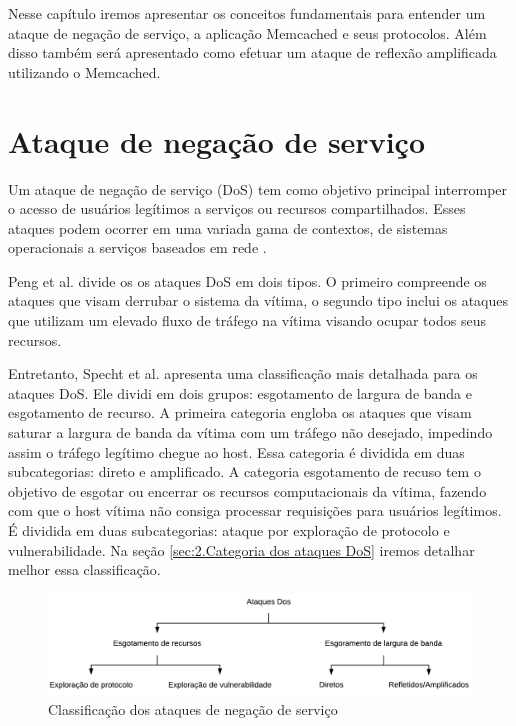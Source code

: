 
Nesse capítulo iremos apresentar os conceitos fundamentais para entender um ataque de negação de serviço, a aplicação Memcached e seus protocolos. Além disso também será apresentado como efetuar um ataque de reflexão amplificada utilizando o Memcached.

\section{Ataque de negação de serviço}

Um ataque de negação de serviço (\acrfull{DoS}) tem como objetivo principal interromper o acesso de usuários legítimos a serviços ou recursos compartilhados. Esses ataques podem ocorrer em uma variada gama de contextos, de sistemas operacionais a serviços baseados em rede \cite{Peng2007}.

Peng et al.\cite{Peng2007} divide os os ataques DoS em dois tipos. O primeiro compreende os ataques que visam derrubar o sistema da vítima, o segundo tipo inclui os ataques que utilizam um elevado fluxo de tráfego na vítima visando ocupar todos seus recursos. 

Entretanto, Specht et al.\cite{Specht2004} apresenta uma classificação mais detalhada para os ataques DoS. Ele dividi em dois grupos: esgotamento de largura de banda e esgotamento de recurso. A primeira categoria engloba os ataques que visam saturar a largura de banda da vítima com um tráfego não desejado, impedindo assim o tráfego legítimo chegue ao host. Essa categoria é dividida em duas subcategorias: direto e amplificado. A categoria esgotamento de recuso tem o objetivo de esgotar ou encerrar os recursos computacionais da vítima, fazendo com que o host vítima não consiga processar requisições para usuários legítimos. É dividida em duas subcategorias: ataque por exploração de protocolo e vulnerabilidade. Na seção \ref{sec:2.Categoria dos ataques DoS} iremos detalhar melhor essa classificação.

\begin{figure}[H]
     \centering
     \includegraphics[scale=0.75]{img/ClassificacaoDos.pdf}
     \caption{Classificação dos ataques de negação de serviço}
     \label{img:DDoS}
\end{figure}

